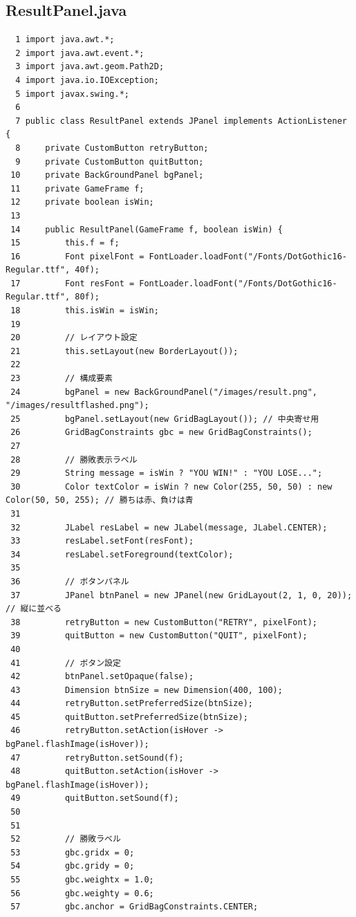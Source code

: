 \documentclass[11pt,a4j]{jarticle}
\begin{document}
\subsection*{ResultPanel.java}
\begin{small}
\begin{verbatim}
  1 import java.awt.*;
  2 import java.awt.event.*;
  3 import java.awt.geom.Path2D;
  4 import java.io.IOException;
  5 import javax.swing.*;
  6 
  7 public class ResultPanel extends JPanel implements ActionListener {
  8     private CustomButton retryButton;
  9     private CustomButton quitButton;
 10     private BackGroundPanel bgPanel;
 11     private GameFrame f;
 12     private boolean isWin;
 13 
 14     public ResultPanel(GameFrame f, boolean isWin) {
 15         this.f = f;
 16         Font pixelFont = FontLoader.loadFont("/Fonts/DotGothic16-Regular.ttf", 40f);
 17         Font resFont = FontLoader.loadFont("/Fonts/DotGothic16-Regular.ttf", 80f);
 18         this.isWin = isWin;
 19 
 20         // レイアウト設定
 21         this.setLayout(new BorderLayout());
 22 
 23         // 構成要素
 24         bgPanel = new BackGroundPanel("/images/result.png", "/images/resultflashed.png");
 25         bgPanel.setLayout(new GridBagLayout()); // 中央寄せ用
 26         GridBagConstraints gbc = new GridBagConstraints();
 27 
 28         // 勝敗表示ラベル
 29         String message = isWin ? "YOU WIN!" : "YOU LOSE...";
 30         Color textColor = isWin ? new Color(255, 50, 50) : new Color(50, 50, 255); // 勝ちは赤、負けは青
 31 
 32         JLabel resLabel = new JLabel(message, JLabel.CENTER);
 33         resLabel.setFont(resFont);
 34         resLabel.setForeground(textColor);
 35         
 36         // ボタンパネル
 37         JPanel btnPanel = new JPanel(new GridLayout(2, 1, 0, 20)); // 縦に並べる
 38         retryButton = new CustomButton("RETRY", pixelFont);
 39         quitButton = new CustomButton("QUIT", pixelFont);
 40 
 41         // ボタン設定
 42         btnPanel.setOpaque(false);
 43         Dimension btnSize = new Dimension(400, 100);
 44         retryButton.setPreferredSize(btnSize);
 45         quitButton.setPreferredSize(btnSize);
 46         retryButton.setAction(isHover -> bgPanel.flashImage(isHover));
 47         retryButton.setSound(f);
 48         quitButton.setAction(isHover -> bgPanel.flashImage(isHover));
 49         quitButton.setSound(f);
 50 
 51         
 52         // 勝敗ラベル
 53         gbc.gridx = 0;
 54         gbc.gridy = 0;
 55         gbc.weightx = 1.0;
 56         gbc.weighty = 0.6; 
 57         gbc.anchor = GridBagConstraints.CENTER;

\end{verbatim}
\end{small}
\end{document}
